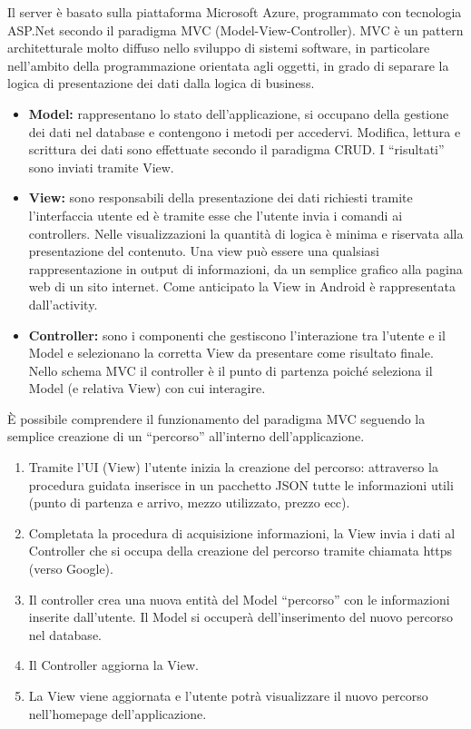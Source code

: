 Il server è basato sulla piattaforma Microsoft Azure, programmato con tecnologia ASP.Net secondo il paradigma MVC (Model-View-Controller). MVC è un pattern architetturale molto diffuso nello sviluppo di sistemi software, in particolare nell'ambito della programmazione orientata agli oggetti, in grado di separare la logica di presentazione dei dati dalla logica di business.
\begin{itemize}
\item \textbf{Model:} rappresentano lo stato dell’applicazione, si occupano della gestione dei dati nel database e contengono i metodi per accedervi. Modifica, lettura e scrittura dei dati sono effettuate secondo il paradigma CRUD. I “risultati” sono inviati tramite View.
\item \textbf{View:} sono responsabili della presentazione dei dati richiesti tramite l’interfaccia utente ed è tramite esse che l’utente invia i comandi ai controllers. Nelle visualizzazioni la quantità di logica è minima e riservata alla presentazione del contenuto. Una view può essere una qualsiasi rappresentazione in output di informazioni, da un semplice grafico alla pagina web di un sito internet.
Come anticipato la View in Android è rappresentata dall'activity.
\item \textbf{Controller:} sono i componenti che gestiscono l’interazione tra l’utente e il Model e selezionano la corretta View da presentare come risultato finale. Nello schema MVC il controller è il punto di partenza poiché seleziona il Model (e relativa View) con cui interagire.
\end{itemize}
È possibile comprendere il funzionamento del paradigma MVC seguendo la semplice creazione di un “percorso” all’interno dell’applicazione.
\begin{enumerate}
\item Tramite l’UI (View) l’utente inizia la creazione del percorso: attraverso la procedura guidata inserisce in un pacchetto JSON tutte le informazioni utili (punto di partenza e arrivo, mezzo utilizzato, prezzo ecc).
\item Completata la procedura di acquisizione informazioni, la View invia i dati al Controller che si occupa della creazione del percorso tramite chiamata https (verso Google).
\item Il controller crea una nuova entità del Model “percorso” con le informazioni inserite dall’utente. Il Model si occuperà dell’inserimento del nuovo percorso nel database.
\item Il Controller aggiorna la View.
\item La View viene aggiornata e l’utente potrà visualizzare il nuovo percorso nell’homepage dell’applicazione.
\end{enumerate}

